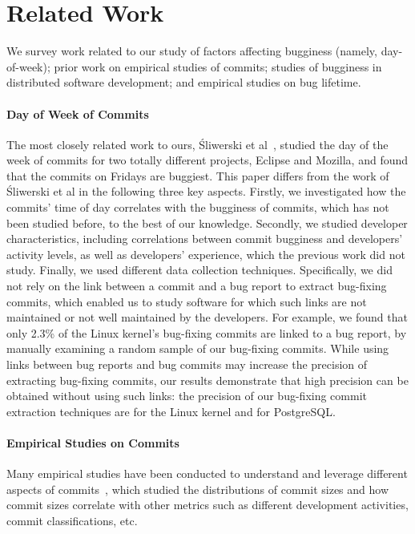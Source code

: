 \section{Related Work}
\label{sec-related}

We survey work related to our study of factors affecting bugginess (namely,
day-of-week); prior work on empirical studies of commits; studies of bugginess
in distributed software development; and empirical studies on bug lifetime.

\paragraph{Day of Week of Commits}

The most closely related work to ours, \'Sliwerski et
al~\cite{sliwerski-msr-2005}, studied the day of the week of commits for two
totally different projects, Eclipse and Mozilla, and found that the commits on
Fridays are buggiest. This paper differs from the work of \'Sliwerski et al in
the following three key aspects. Firstly, we investigated how the commits' time
of day correlates with the bugginess of commits, which has not been studied
before, to the best of our knowledge. Secondly, we studied developer
characteristics, including correlations between commit bugginess and developers'
activity levels, as well as developers' experience, which the previous work did
not study. Finally, we used different data collection techniques. Specifically,
we did not rely on the link between a commit and a bug report to extract
bug-fixing commits, which enabled us to study software for which such links are
not maintained or not well maintained by the developers. For example, we found
that only 2.3\% of the Linux kernel's bug-fixing commits are linked to a bug
report, by manually examining a random sample of our bug-fixing commits. While
using links between bug reports and bug commits may increase the precision of
extracting bug-fixing commits, our results demonstrate that high precision can
be obtained without using such links: the precision of our bug-fixing commit
extraction techniques are \linuxP for the Linux kernel and \postP for
PostgreSQL.


\paragraph{Empirical Studies on Commits}

Many empirical studies have been conducted to understand and leverage different
aspects of
commits~\cite{hattori2008nature,largeCommits,commitTextualClassification,
  smallCommits05, Swanson76}, which studied the distributions of commit sizes
and how commit sizes correlate with other metrics such as different development
activities, commit classifications, etc.

